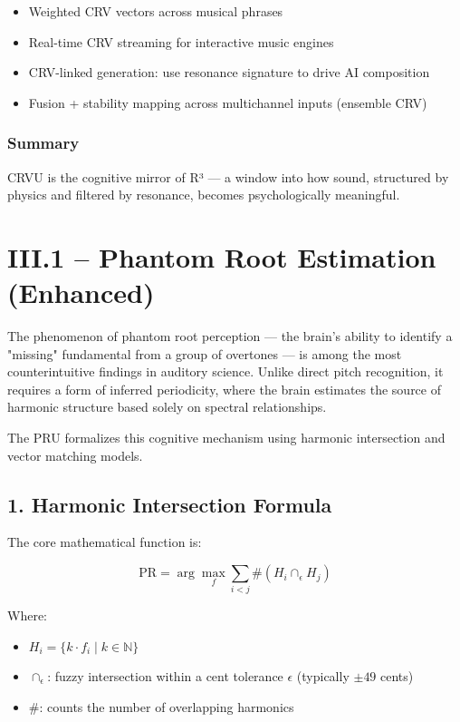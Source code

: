 \begin{itemize}
    \item Weighted CRV vectors across musical phrases
    \item Real-time CRV streaming for interactive music engines
    \item CRV-linked generation: use resonance signature to drive AI composition
    \item Fusion + stability mapping across multichannel inputs (ensemble CRV)
\end{itemize}

\subsubsection*{Summary}

CRVU is the cognitive mirror of R³ — a window into how sound, structured by physics and filtered by resonance, becomes psychologically meaningful.

\section*{III.1 – Phantom Root Estimation (Enhanced)}

The phenomenon of phantom root perception — the brain's ability to identify a "missing" fundamental from a group of overtones — is among the most counterintuitive findings in auditory science. Unlike direct pitch recognition, it requires a form of inferred periodicity, where the brain estimates the source of harmonic structure based solely on spectral relationships.

The PRU formalizes this cognitive mechanism using harmonic intersection and vector matching models.

\subsection*{1. Harmonic Intersection Formula}

The core mathematical function is:

\[
\text{PR} = \arg\max_f \sum_{i<j} \#(H_i \cap_\epsilon H_j)
\]

Where:

\begin{itemize}
    \item $H_i = \{k \cdot f_i \mid k \in \mathbb{N} \}$
    \item $\cap_\epsilon$: fuzzy intersection within a cent tolerance $\epsilon$ (typically $\pm49$ cents)
    \item $\#$: counts the number of overlapping harmonics
\end{itemize}

